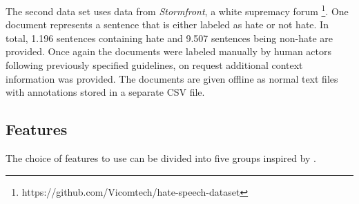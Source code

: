 The second data set uses data from \textit{Stormfront}, a white supremacy forum \cite{DeGibert2020}\footnote{https://github.com/Vicomtech/hate-speech-dataset}. One document represents a sentence that is either labeled as hate or not hate. In total, 1.196 sentences containing hate and 9.507 sentences being non-hate are provided. Once again the documents were labeled manually by human actors following previously specified guidelines, on request additional context information was provided. The documents are given offline as normal text files with annotations stored in a separate CSV file. 

\subsection{Features}
\label{ch:approachC}

The choice of features to use can be divided into five groups inspired by \cite{Watanabe2018}. 

